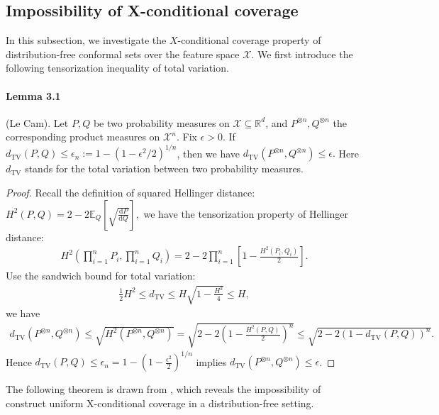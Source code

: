 \documentclass{article}
\numberwithin{equation}{section}
\newcommand{\E}{\mathbb{E}}
\begin{document}
\subsection{Impossibility of X-conditional coverage}
In this subsection, we investigate the $X$-conditional coverage property of distribution-free conformal sets over the feature space $\mathcal{X}.$ We first introduce the following tensorization inequality of total variation.

\paragraph{Lemma 3.1\label{Lemma 3.1}} (Le Cam). Let $P,Q$ be two probability measures on $\mathcal{X}\subseteq\mathbb{R}^d$, and $P^{\otimes n}, Q^{\otimes n}$ the corresponding product measures on $\mathcal{X}^n.$ Fix $\epsilon>0.$ If $d_\mathrm{TV}(P,Q)\leq \epsilon_n:= 1-(1-\epsilon^2/2)^{1/n}$, then we have $d_\mathrm{TV}(P^{\otimes n},Q^{\otimes n}) \leq \epsilon.$ Here $d_\mathrm{TV}$ stands for the total variation between two probability measures.
\begin{proof}
Recall the definition of squared Hellinger distance: $H^2(P,Q) = 2-2\E_Q\left[\sqrt{\frac{\mathrm{d}P}{\mathrm{d}Q}}\right],$ we have the tensorization property of Hellinger distance:
\begin{align*}
	H^2\left(\prod_{i=1}^n P_i,\prod_{i=1}^n Q_i\right) = 2-2\prod_{i=1}^n\left[1-\frac{H^2(P_i,Q_i)}{2}\right].\tag{3.7}
\end{align*}
Use the sandwich bound for total variation:
\begin{align*}
	\frac{1}{2}H^2\leq d_{\mathrm{TV}}\leq H\sqrt{1-\frac{H^2}{4}}\leq H,\tag{3.8}
\end{align*}
we have
\begin{align*}
	d_\mathrm{TV}(P^{\otimes n},Q^{\otimes n})\leq \sqrt{H^2(P^{\otimes n},Q^{\otimes n})} = \sqrt{2-2\left(1-\frac{H^2(P,Q)}{2}\right)^n}\leq\sqrt{2-2(1-d_\mathrm{TV}(P,Q))^n}.\tag{3.9}
\end{align*}
Hence $d_{\mathrm{TV}}(P,Q)\leq \epsilon_n = 1-\left(1-\frac{\epsilon^2}{2}\right)^{1/n}$ implies $d_\mathrm{TV}(P^{\otimes n},Q^{\otimes n})\leq \epsilon$.
\end{proof}

The following theorem is drawn from \citet{LW}, which reveals the impossibility of construct uniform X-conditional coverage in a distribution-free setting.
\end{document}
